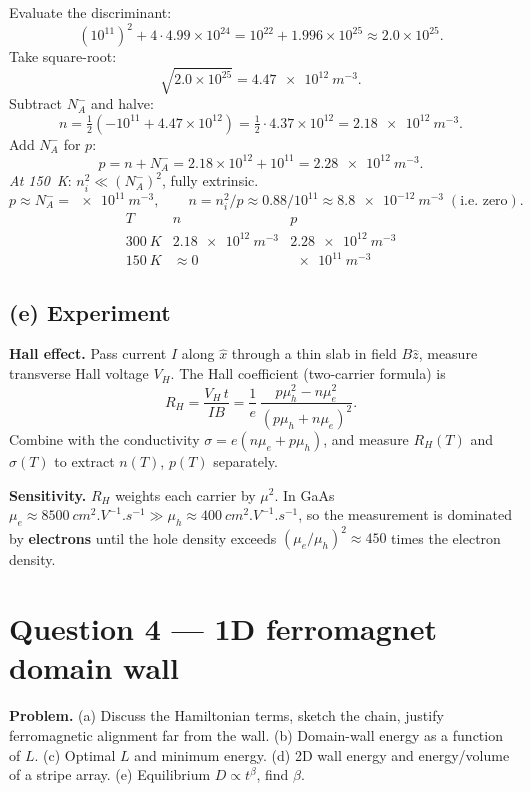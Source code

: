 \documentclass[11pt]{article}
\begin{document}
Evaluate the discriminant:
\[
(10^{11})^2 + 4\cdot 4.99\times 10^{24} = 10^{22} + 1.996\times 10^{25} \approx 2.0\times 10^{25}.
\]
Take square-root:
\[
\sqrt{2.0\times 10^{25}} = \SI{4.47e12}{m^{-3}}.
\]
Subtract $N_A^-$ and halve:
\[
n = \tfrac12(-10^{11} + 4.47\times 10^{12}) = \tfrac12\cdot 4.37\times 10^{12} = \SI{2.18e12}{m^{-3}}.
\]
Add $N_A^-$ for $p$:
\[
p = n + N_A^- = 2.18\times 10^{12} + 10^{11} = \SI{2.28e12}{m^{-3}}.
\]
\emph{At \SI{150}{K}}: $n_i^2\ll (N_A^-)^2$, fully extrinsic.
\[
p \approx N_A^- = \SI{e11}{m^{-3}},\qquad n = n_i^2/p \approx 0.88/10^{11} \approx \SI{8.8e-12}{m^{-3}}\;(\text{i.e.\ zero}).
\]
\[
\boxed{\;\begin{array}{c|cc}
T & n & p \\\hline
\SI{300}{K} & \SI{2.18e12}{m^{-3}} & \SI{2.28e12}{m^{-3}}\\
\SI{150}{K} & \approx 0 & \SI{e11}{m^{-3}}
\end{array}\;}
\]

\subsection*{(e) Experiment}

\textbf{Hall effect.} Pass current $I$ along $\hat x$ through a thin slab in field $B\hat z$, measure transverse Hall voltage $V_H$. The Hall coefficient (two-carrier formula) is
\[
R_H = \frac{V_H\,t}{I B} = \frac{1}{e}\,\frac{p\mu_h^2 - n\mu_e^2}{(p\mu_h + n\mu_e)^2}.
\]
Combine with the conductivity $\sigma = e(n\mu_e + p\mu_h)$, and measure $R_H(T)$ and $\sigma(T)$ to extract $n(T)$, $p(T)$ separately.

\textbf{Sensitivity.} $R_H$ weights each carrier by $\mu^2$. In GaAs $\mu_e\approx \SI{8500}{cm^2.V^{-1}.s^{-1}}\gg\mu_h\approx\SI{400}{cm^2.V^{-1}.s^{-1}}$, so the measurement is dominated by \textbf{electrons} until the hole density exceeds $(\mu_e/\mu_h)^2\approx 450$ times the electron density.

\section*{Question 4 --- 1D ferromagnet domain wall}

\textbf{Problem.} (a) Discuss the Hamiltonian terms, sketch the chain, justify ferromagnetic alignment far from the wall. (b) Domain-wall energy as a function of $L$. (c) Optimal $L$ and minimum energy. (d) 2D wall energy and energy/volume of a stripe array. (e) Equilibrium $D\propto t^\beta$, find $\beta$.
\end{document}
